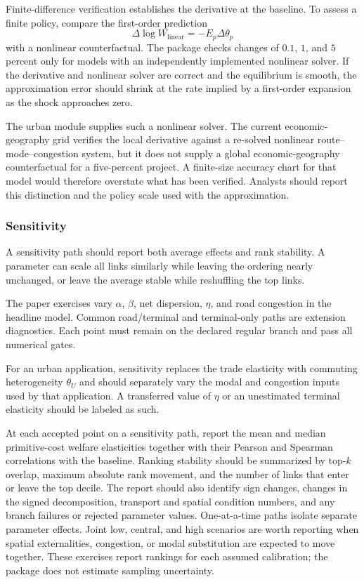 Finite-difference verification establishes the derivative at the baseline. To
assess a finite policy, compare the first-order prediction
\[
 \Delta\log W_{\mathrm{linear}}=-E_p\Delta\theta_p
\]
with a nonlinear counterfactual. The package checks changes of \(0.1\), \(1\),
and \(5\) percent only for models with an independently implemented nonlinear
solver. If the derivative and nonlinear solver are correct and the equilibrium
is smooth, the approximation error should shrink at the rate implied by a
first-order expansion as the shock approaches zero.

The urban module supplies such a nonlinear solver. The current
economic-geography grid verifies the local derivative against a re-solved
nonlinear route--mode--congestion system, but it does not supply a global
economic-geography counterfactual for a five-percent project. A finite-size
accuracy chart for that model would therefore overstate what has been
verified. Analysts should report this distinction and the policy scale used
with the approximation.

\subsubsection{Sensitivity}

A sensitivity path should report both average effects and rank stability. A
parameter can scale all links similarly while leaving the ordering nearly
unchanged, or leave the average stable while reshuffling the top links.

The paper exercises vary \(\alpha\), \(\beta\), net dispersion, \(\eta\), and
road congestion in the headline model. Common road/terminal and terminal-only
paths are extension diagnostics. Each point must remain on the declared
regular branch and pass all numerical gates.

For an urban application, sensitivity replaces the trade elasticity with
commuting heterogeneity \(\theta_U\) and should separately vary the modal and
congestion inputs used by that application. A transferred value of \(\eta\)
or an unestimated terminal elasticity should be labeled as such.

At each accepted point on a sensitivity path, report the mean and median
primitive-cost welfare elasticities together with their Pearson and Spearman
correlations with the baseline. Ranking stability should be summarized by
top-\(k\) overlap, maximum absolute rank movement, and the number of links that
enter or leave the top decile. The report should also identify sign changes,
changes in the signed decomposition, transport and spatial condition numbers,
and any branch failures or rejected parameter values.
One-at-a-time paths isolate separate parameter effects. Joint low, central,
and high scenarios are worth reporting when spatial externalities,
congestion, or modal substitution are expected to move together. These
exercises report rankings for each assumed calibration; the package does not
estimate sampling uncertainty.

